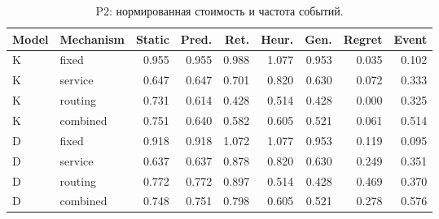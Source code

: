 \begin{table}[htbp]\caption{P2: нормированная стоимость и частота событий.}\centering\small\setlength{\tabcolsep}{3pt}

\begin{tabular}{llrrrrrrr}\toprule

Model & Mechanism & Static & Pred. & Ret. & Heur. & Gen. & Regret & Event\\\midrule

K & fixed & 0.955 & 0.955 & 0.988 & 1.077 & 0.953 & 0.035 & 0.102\\

K & service & 0.647 & 0.647 & 0.701 & 0.820 & 0.630 & 0.072 & 0.333\\

K & routing & 0.731 & 0.614 & 0.428 & 0.514 & 0.428 & 0.000 & 0.325\\

K & combined & 0.751 & 0.640 & 0.582 & 0.605 & 0.521 & 0.061 & 0.514\\

D & fixed & 0.918 & 0.918 & 1.072 & 1.077 & 0.953 & 0.119 & 0.095\\

D & service & 0.637 & 0.637 & 0.878 & 0.820 & 0.630 & 0.249 & 0.351\\

D & routing & 0.772 & 0.772 & 0.897 & 0.514 & 0.428 & 0.469 & 0.370\\

D & combined & 0.748 & 0.751 & 0.798 & 0.605 & 0.521 & 0.278 & 0.576\\

\bottomrule\end{tabular}\end{table}

